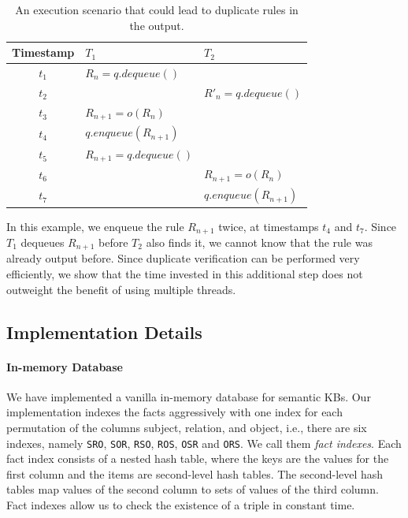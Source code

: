 \begin{table}
\centering
 \begin{tabular}{c|l|l}
  Timestamp & $T_1$ & $T_2$\\  \hline
  $t_1$ & $R_n = q.dequeue()$	&  \\
  $t_2$ & & $R'_n = q.dequeue()$ \\
  $t_3$ & $R_{n+1} = o(R_n)$  & \\
  $t_4$ & $q.enqueue(R_{n+1})$  & \\
  $t_5$ & $R_{n+1} = q.dequeue()$ & \\
  $t_6$ & & $R_{n+1} = o(R_n)$ \\
  $t_7$ & & $q.enqueue(R_{n+1})$ \\
\end{tabular}
\caption{An execution scenario that could lead to duplicate rules in the output.}\label{tab:duplicates}
\end{table}

In this example, we enqueue the rule $R_{n+1}$ twice, at timestamps $t_4$ and $t_7$. 
Since $T_1$ dequeues $R_{n+1}$ before $T_2$ also finds it, 
we cannot know that the rule was already output before. 
Since duplicate verification
can be performed very efficiently, we show that the time invested in this additional step does not  
outweight the benefit of using multiple threads.



\subsection{Implementation Details}
\label{subsec:implementation}

\paragraph{In-memory Database}
We have implemented a vanilla in-memory database for semantic KBs.
Our implementation indexes the facts aggressively with one index for each permutation of 
the columns subject, relation, and object, i.e., there are six indexes, namely \texttt{SRO}, \texttt{SOR}, 
\texttt{RSO}, \texttt{ROS}, \texttt{OSR} and \texttt{ORS}. We call them \emph{fact indexes}.
Each fact index consists of a nested hash table, where the keys are the values for the first column and the items
are second-level hash tables. The second-level hash tables map values of the second column
to sets of values of the third column. 
Fact indexes allow us to check the existence of a triple in constant time.
% 


